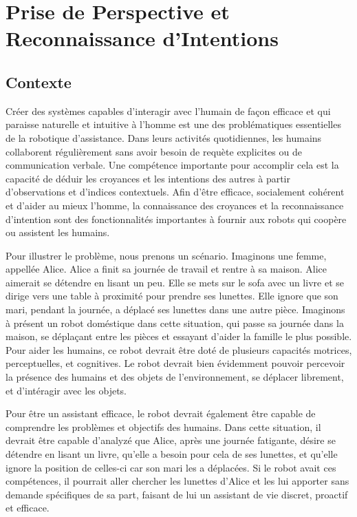 \documentclass[a4paper,11pt,twoside]{StyleThese}
\begin{document}
\setcounter{chapter}{3} %
\dominitoc
\faketableofcontents
\fi

\chapter{Prise de Perspective et Reconnaissance d'Intentions}
\label{chapter4}
\minitoc

\section{Contexte}
Créer des systèmes capables d'interagir avec l'humain de façon efficace et qui paraisse naturelle et intuitive à l'homme est une des problématiques essentielles de la robotique d'assistance. Dans leurs activités quotidiennes, les humains collaborent régulièrement sans avoir besoin de requète explicites ou de communication verbale. Une compétence importante pour accomplir cela est la capacité de déduir les croyances et les intentions des autres à partir d'observations et d'indices contextuels. Afin d'être efficace, socialement cohérent et d'aider au mieux l'homme, la connaissance des croyances et la reconnaissance d'intention sont des fonctionnalités importantes à fournir aux robots qui coopère ou assistent les humains.

Pour illustrer le problème, nous prenons un scénario. Imaginons une femme, appellée Alice. Alice a finit sa journée de travail et rentre à sa maison. Alice aimerait se détendre en lisant un peu. Elle se mets sur le sofa avec un livre et se dirige vers une table à proximité pour prendre ses lunettes. Elle ignore que son mari, pendant la journée, a déplacé ses lunettes dans une autre pièce.
Imaginons à présent un robot doméstique dans cette situation, qui passe sa journée dans la maison, se déplaçant entre les pièces et essayant d'aider la famille le plus possible. Pour aider les humains, ce robot devrait être doté de plusieurs capacités motrices, perceptuelles, et cognitives. Le robot devrait bien évidemment pouvoir percevoir la présence des humains et des objets de l'environnement, se déplacer librement, et d'intéragir avec les objets.

Pour être un assistant efficace, le robot devrait également être capable de comprendre les problèmes et objectifs des humains. Dans cette situation, il devrait être capable d'analyzé que Alice, après une journée fatigante, désire se détendre en lisant un livre, qu'elle a besoin pour cela de ses lunettes, et qu'elle ignore la position de celles-ci car son mari les a déplacées. Si le robot avait ces compétences, il pourrait aller chercher les lunettes d'Alice et les lui apporter sans demande spécifiques de sa part, faisant de lui un assistant de vie discret, proactif et efficace.
\end{document}
